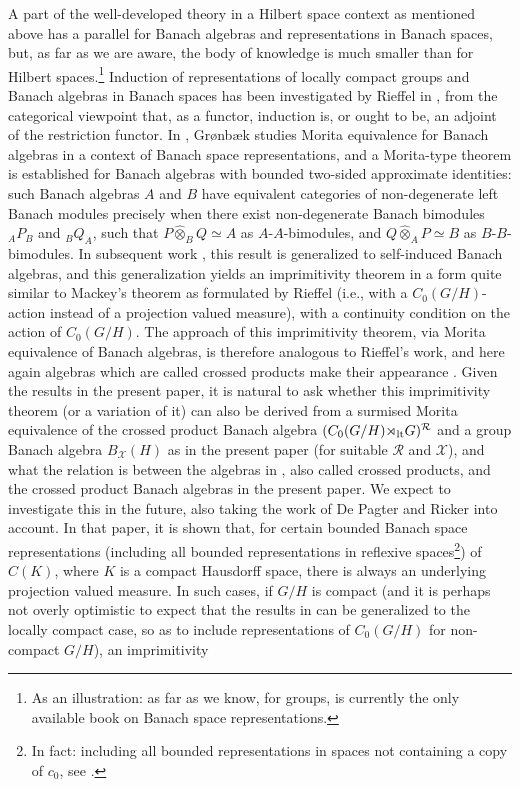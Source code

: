 \documentclass{amsart}
\theoremstyle{plain}
\theoremstyle{definition}
\numberwithin{equation}{section}
\begin{document}
A part of the well-developed theory in a Hilbert space context as mentioned above has a parallel for Banach algebras and representations in Banach spaces, but, as far as we are aware, the body of knowledge is much smaller than for Hilbert spaces.\footnote{As an illustration: as far as we know, for groups, \cite{lyubich} is currently the only available book on Banach space representations.} Induction of representations of locally compact groups and Banach algebras in Banach spaces has been investigated by Rieffel in \cite{rieffelinducedbanach}, from the categorical viewpoint that, as a functor, induction is, or ought to be, an adjoint of the restriction functor. In \cite{gronbaekimprimitivity}, Gr{\o}nb{\ae}k studies Morita equivalence for Banach algebras in a context of Banach space representations, and a Morita-type theorem \cite[Corollary~3.4]{gronbaekmorita} is established for Banach algebras with bounded two-sided approximate identities: such Banach algebras $A$ and $B$ have equivalent categories of non-degenerate left Banach modules precisely when there exist non-degenerate Banach bimodules ${_A}P_B$ and ${_B}Q_A$, such that $P{\widehat{\otimes}}_B Q\simeq A$ as $A$-$A$-bimodules, and $Q{\widehat{\otimes}}_A P\simeq B$ as $B$-$B$-bimodules. In subsequent work \cite{gronbaekmoritaselfinduced}, this result is generalized to self-induced Banach algebras, and this generalization yields an imprimitivity theorem \cite[Theorem~IV.9]{gronbaekimprimitivity} in a form quite similar to Mackey's theorem as formulated by Rieffel \cite[Theorem~7.18]{rieffelinducedadvances} (i.e., with a $C_0(G/H)$-action instead of a projection valued measure), with a continuity condition on the action of $C_0(G/H)$. The approach of this imprimitivity theorem, via Morita equivalence of Banach algebras, is therefore analogous to Rieffel's work, and here again algebras which are called crossed products make their appearance \cite[Definition~IV.1]{gronbaekimprimitivity}. Given the results in the present paper, it is natural to ask whether this imprimitivity theorem (or a variation of it) can also be derived from a surmised Morita equivalence of the crossed product Banach algebra $(C_0(G/H){\rtimes}_{\textup{lt}} G)^{\mathcal R}$ and a group Banach algebra $B_{\mathcal X}(H)$ as in the present paper (for suitable ${\mathcal R}$ and ${\mathcal X}$), and what the relation is between the algebras in  \cite[Definition~IV.1]{gronbaekimprimitivity}, also called crossed products, and the crossed product Banach algebras in the present paper. We expect to investigate this in the future, also taking the work of De Pagter and Ricker \cite{depagterricker} into account. In that paper, it is shown that, for certain bounded Banach space representations (including all bounded representations in reflexive spaces\footnote{In fact: including all bounded representations in spaces not containing a copy of $c_0$, see \cite[Corollary~2.16]{depagterricker}.}) of $C(K)$, where $K$ is a compact Hausdorff space, there is always an underlying projection valued measure. In such cases, if $G/H$ is compact (and it is perhaps not overly optimistic to expect that the results in \cite{depagterricker} can be generalized to the locally compact case, so as to include representations of $C_0(G/H)$ for non-compact $G/H$), an imprimitivity 
\end{document}
